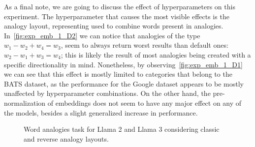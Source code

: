 As a final note, we are going to discuss the effect of hyperparameters on this experiment.
The hyperparameter that causes the most visible effects is the analogy layout, representing  used to combine words present in analogies.
In~\cref{fig:exp_emb_1_D2} we can notice that analogies of the type $w_1 - w_2 + w_4 = w_3$, seem to always return worst results than default ones: $w_2 - w_1 + w_3 = w_4$; this is likely the result of most analogies being created with a specific directionality in mind.
Nonetheless, by observing~\cref{fig:exp_emb_1_D1} we can see that this effect is mostly limited to categories that belong to the BATS dataset, as the performance for the Google dataset appears to be mostly unaffected by hyperparameter combinations.
On the other hand, the pre-normalization of embeddings does not seem to have any major effect on any of the models, besides a slight generalized increase in performance.

\begin{figure}[t!]
    \centering
    \quad
    \caption{Word analogies task for Llama 2 and Llama 3 considering classic and reverse analogy layouts.}
    \label{fig:exp_emb_1_D}
\end{figure}

